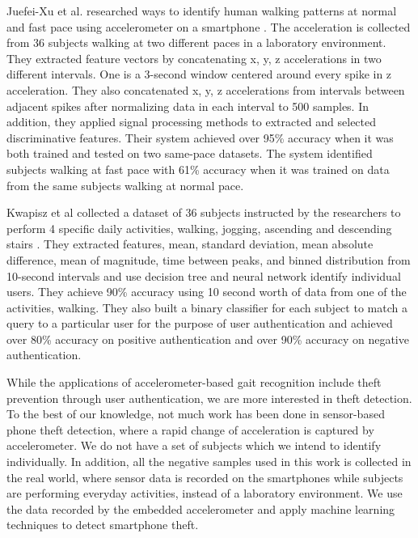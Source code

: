 \documentclass{soups}
\begin{document}
Juefei-Xu et al. researched ways to identify human walking patterns at normal and fast pace using accelerometer on a smartphone \cite{xu:pace}. The acceleration is collected from 36 subjects walking at two different paces in a laboratory environment. They extracted feature vectors by concatenating x, y, z accelerations in two different intervals. One is a 3-second window centered around every spike in z acceleration. They also concatenated x, y, z accelerations from intervals between adjacent spikes after normalizing data in each interval to 500 samples. In addition, they applied signal processing methods to extracted and selected discriminative features. Their system achieved over 95\% accuracy when it was both trained and tested on two same-pace datasets. The system identified subjects walking at fast pace with 61\% accuracy when it was trained on data from the same subjects walking at normal pace.

Kwapisz et al collected a dataset of 36 subjects instructed by the researchers to perform 4 specific daily activities, walking, jogging, ascending and descending stairs \cite{kwapisz:biometrics}. They extracted features, mean, standard deviation, mean absolute difference, mean of magnitude, time between peaks, and binned distribution from 10-second intervals and use decision tree and neural network identify individual users. They achieve 90\% accuracy using 10 second worth of data from one of the activities, walking. They also built a binary classifier for each subject to match a query to a particular user for the purpose of user authentication and achieved over 80\% accuracy on positive authentication and over 90\% accuracy on negative authentication.

\cite{feng:pickup}

While the applications of accelerometer-based gait recognition include theft prevention through user authentication, we are more interested in theft detection. To the best of our knowledge, not much work has been done in sensor-based phone theft detection, where a rapid change of acceleration is captured by accelerometer. We do not have a set of subjects which we intend to identify individually. In addition, all the negative samples used in this work is collected in the real world, where sensor data is recorded on the smartphones while subjects are performing everyday activities, instead of a laboratory environment. We use the data recorded by the embedded accelerometer and apply machine learning techniques to detect smartphone theft.
\end{document}
